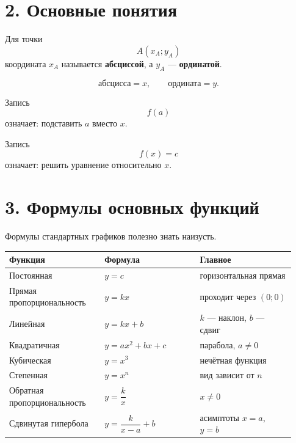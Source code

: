 \documentclass[a4paper,12pt]{article}
\newcommand{\key}[1]{\textcolor{darkaccent}{\textbf{#1}}}
\newcommand{\sepLine}{\par\vspace{2mm}{\color{lightaccent}\rule{\linewidth}{0.8pt}}\vspace{2mm}}
\begin{document}
\sepLine

\section*{\textcolor{darkaccent}{2. Основные понятия}}

Для точки
\[
A(x_A;y_A)
\]
координата $x_A$ называется \key{абсциссой}, а $y_A$ --- \key{ординатой}.

\[
\boxed{\text{абсцисса}=x},
\qquad
\boxed{\text{ордината}=y}.
\]

Запись
\[
f(a)
\]
означает: подставить $a$ вместо $x$.

Запись
\[
f(x)=c
\]
означает: решить уравнение относительно $x$.

\sepLine

\section*{\textcolor{darkaccent}{3. Формулы основных функций}}

Формулы стандартных графиков полезно знать наизусть.

\begin{center}
\small
\renewcommand{\arraystretch}{1.25}
\begin{tabular}{@{}p{0.31\linewidth}p{0.31\linewidth}p{0.31\linewidth}@{}}
\toprule
\textbf{Функция} & \textbf{Формула} & \textbf{Главное} \\
\midrule
Постоянная & $y=c$ & горизонтальная прямая \\
Прямая пропорциональность & $y=kx$ & проходит через $(0;0)$ \\
Линейная & $y=kx+b$ & $k$ --- наклон, $b$ --- сдвиг \\
Квадратичная & $y=ax^2+bx+c$ & парабола, $a\ne0$ \\
Кубическая & $y=x^3$ & нечётная функция \\
Степенная & $y=x^n$ & вид зависит от $n$ \\
Обратная пропорциональность & $y=\dfrac{k}{x}$ & $x\ne0$ \\
Сдвинутая гипербола & $y=\dfrac{k}{x-a}+b$ & асимптоты $x=a$, $y=b$ \\
\bottomrule
\end{tabular}
\end{center}
\end{document}
